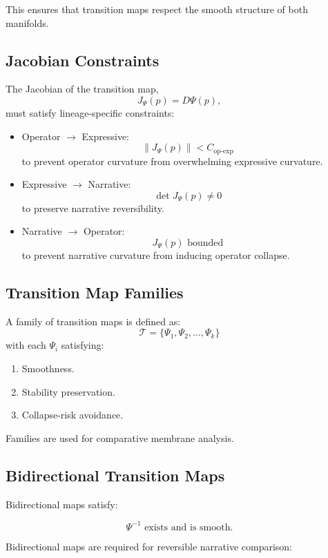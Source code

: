 This ensures that transition maps respect the smooth structure of both
manifolds.

\subsection{Jacobian Constraints}

The Jacobian of the transition map,
\[
J_{\Psi}(p) = D\Psi(p),
\]
must satisfy lineage-specific constraints:

\begin{itemize}
    \item Operator $\rightarrow$ Expressive:
    \[
    \| J_{\Psi}(p) \| < C_{\text{op-exp}}
    \]
    to prevent operator curvature from overwhelming expressive curvature.

    \item Expressive $\rightarrow$ Narrative:
    \[
    \det J_{\Psi}(p) \neq 0
    \]
    to preserve narrative reversibility.

    \item Narrative $\rightarrow$ Operator:
    \[
    J_{\Psi}(p) \text{ bounded}
    \]
    to prevent narrative curvature from inducing operator collapse.
\end{itemize}

\subsection{Transition Map Families}

A family of transition maps is defined as:
\[
\mathcal{T} = \{ \Psi_1, \Psi_2, \ldots, \Psi_k \}
\]
with each $\Psi_i$ satisfying:

\begin{enumerate}
    \item Smoothness.
    \item Stability preservation.
    \item Collapse-risk avoidance.
\end{enumerate}

Families are used for comparative membrane analysis.

\subsection{Bidirectional Transition Maps}

Bidirectional maps satisfy:

\[
\Psi^{-1} \text{ exists and is smooth}.
\]

Bidirectional maps are required for reversible narrative comparison:

